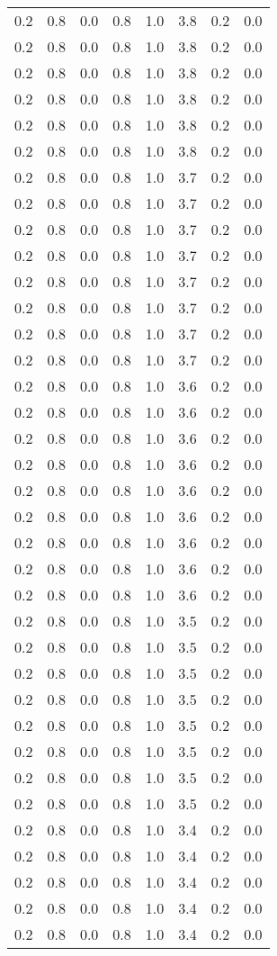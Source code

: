 \begin{tabular}{L{1in}|L{1in}|L{1in}|L{1in}|L{1in}|L{1in}|L{1in}|L{1in}}
0.2&0.8&0.0&0.8&1.0&3.8&0.2&0.0\\
0.2&0.8&0.0&0.8&1.0&3.8&0.2&0.0\\
0.2&0.8&0.0&0.8&1.0&3.8&0.2&0.0\\
0.2&0.8&0.0&0.8&1.0&3.8&0.2&0.0\\
0.2&0.8&0.0&0.8&1.0&3.8&0.2&0.0\\
0.2&0.8&0.0&0.8&1.0&3.8&0.2&0.0\\
0.2&0.8&0.0&0.8&1.0&3.7&0.2&0.0\\
0.2&0.8&0.0&0.8&1.0&3.7&0.2&0.0\\
0.2&0.8&0.0&0.8&1.0&3.7&0.2&0.0\\
0.2&0.8&0.0&0.8&1.0&3.7&0.2&0.0\\
0.2&0.8&0.0&0.8&1.0&3.7&0.2&0.0\\
0.2&0.8&0.0&0.8&1.0&3.7&0.2&0.0\\
0.2&0.8&0.0&0.8&1.0&3.7&0.2&0.0\\
0.2&0.8&0.0&0.8&1.0&3.7&0.2&0.0\\
0.2&0.8&0.0&0.8&1.0&3.6&0.2&0.0\\
0.2&0.8&0.0&0.8&1.0&3.6&0.2&0.0\\
0.2&0.8&0.0&0.8&1.0&3.6&0.2&0.0\\
0.2&0.8&0.0&0.8&1.0&3.6&0.2&0.0\\
0.2&0.8&0.0&0.8&1.0&3.6&0.2&0.0\\
0.2&0.8&0.0&0.8&1.0&3.6&0.2&0.0\\
0.2&0.8&0.0&0.8&1.0&3.6&0.2&0.0\\
0.2&0.8&0.0&0.8&1.0&3.6&0.2&0.0\\
0.2&0.8&0.0&0.8&1.0&3.6&0.2&0.0\\
0.2&0.8&0.0&0.8&1.0&3.5&0.2&0.0\\
0.2&0.8&0.0&0.8&1.0&3.5&0.2&0.0\\
0.2&0.8&0.0&0.8&1.0&3.5&0.2&0.0\\
0.2&0.8&0.0&0.8&1.0&3.5&0.2&0.0\\
0.2&0.8&0.0&0.8&1.0&3.5&0.2&0.0\\
0.2&0.8&0.0&0.8&1.0&3.5&0.2&0.0\\
0.2&0.8&0.0&0.8&1.0&3.5&0.2&0.0\\
0.2&0.8&0.0&0.8&1.0&3.5&0.2&0.0\\
0.2&0.8&0.0&0.8&1.0&3.4&0.2&0.0\\
0.2&0.8&0.0&0.8&1.0&3.4&0.2&0.0\\
0.2&0.8&0.0&0.8&1.0&3.4&0.2&0.0\\
0.2&0.8&0.0&0.8&1.0&3.4&0.2&0.0\\
0.2&0.8&0.0&0.8&1.0&3.4&0.2&0.0\\

\end{tabular}
